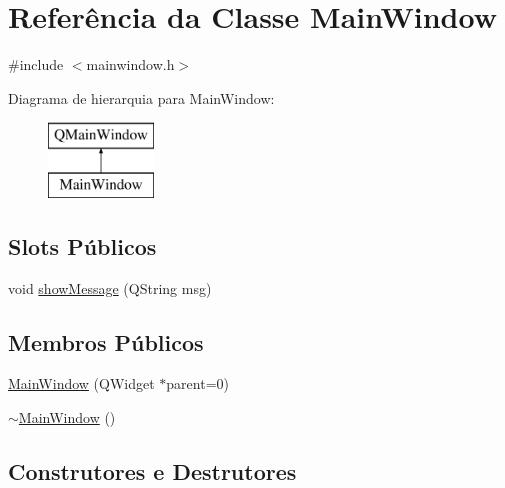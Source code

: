 \hypertarget{class_main_window}{}\section{Referência da Classe Main\+Window}
\label{class_main_window}


{\ttfamily \#include $<$mainwindow.\+h$>$}

Diagrama de hierarquia para Main\+Window\+:\begin{figure}[H]
\begin{center}
\leavevmode
\includegraphics[height=2.000000cm]{class_main_window}
\end{center}
\end{figure}
\subsection*{Slots Públicos}
\begin{DoxyCompactItemize}
\item 
void \mbox{\hyperlink{class_main_window_a0edca0c59fb238bea02b248c90b89698}{show\+Message}} (Q\+String msg)
\end{DoxyCompactItemize}
\subsection*{Membros Públicos}
\begin{DoxyCompactItemize}
\item 
\mbox{\hyperlink{class_main_window_a8b244be8b7b7db1b08de2a2acb9409db}{Main\+Window}} (Q\+Widget $\ast$parent=0)
\item 
\mbox{\hyperlink{class_main_window_ae98d00a93bc118200eeef9f9bba1dba7}{$\sim$\+Main\+Window}} ()
\end{DoxyCompactItemize}


\subsection{Construtores e Destrutores}
\mbox{\label{class_main_window_a8b244be8b7b7db1b08de2a2acb9409db}} 
